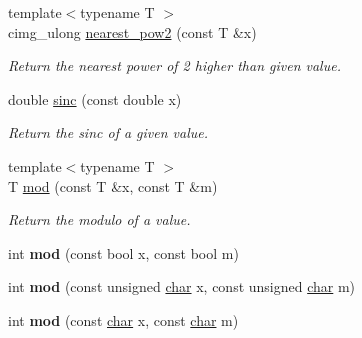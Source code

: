 \begin{DoxyCompactItemize}
{\footnotesize template$<$typename T $>$ }\\cimg\+\_\+ulong \hyperlink{namespacecimg__library__suffixed_1_1cimg_a809b0aa9af68d48f9c6c3f61e3555674}{nearest\+\_\+pow2} (const T \&x)
\begin{DoxyCompactList}\small\item\em Return the nearest power of 2 higher than given value. \end{DoxyCompactList}\item 
\mbox{\label{namespacecimg__library__suffixed_1_1cimg_ae3375412d53d28356063384da9fd9ad2}} 
double \hyperlink{namespacecimg__library__suffixed_1_1cimg_ae3375412d53d28356063384da9fd9ad2}{sinc} (const double x)
\begin{DoxyCompactList}\small\item\em Return the sinc of a given value. \end{DoxyCompactList}\item 
{\footnotesize template$<$typename T $>$ }\\T \hyperlink{namespacecimg__library__suffixed_1_1cimg_afcc02428c9b7d9100e1674369d25cc40}{mod} (const T \&x, const T \&m)
\begin{DoxyCompactList}\small\item\em Return the modulo of a value. \end{DoxyCompactList}\item 
\mbox{\label{namespacecimg__library__suffixed_1_1cimg_ace8c511f2eaca41092ec4f62aa9661ab}} 
int {\bfseries mod} (const bool x, const bool m)
\item 
\mbox{\label{namespacecimg__library__suffixed_1_1cimg_acaf502340ec0683b4ddabf5a792426c9}} 
int {\bfseries mod} (const unsigned \hyperlink{classchar}{char} x, const unsigned \hyperlink{classchar}{char} m)
\item 
\mbox{\label{namespacecimg__library__suffixed_1_1cimg_aec9a354db76b695a13fd4d817286bd8d}} 
int {\bfseries mod} (const \hyperlink{classchar}{char} x, const \hyperlink{classchar}{char} m)
\item 
\mbox{\label{namespacecimg__library__suffixed_1_1cimg_aba178f4f778631ba25c4d715a8bce274}} 

\end{DoxyCompactItemize}
